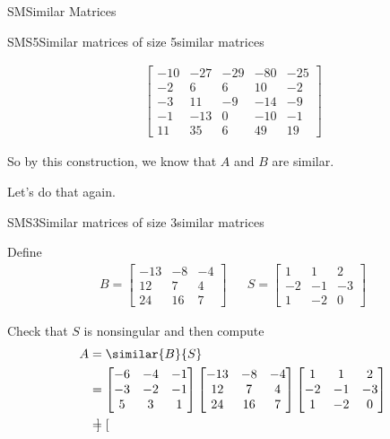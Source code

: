 \begin{subsect}{SM}{Similar Matrices}
\begin{example}{SMS5}{Similar matrices of size 5}{similar matrices}
\begin{para}
\begin{align*}
\begin{bmatrix}
-10 & -27 & -29 & -80 & -25 \\
-2 & 6 & 6 & 10 & -2 \\
-3 & 11 & -9 & -14 & -9 \\
-1 & -13 & 0 & -10 & -1 \\
11 & 35 & 6 & 49 & 19
\end{bmatrix}
%
\end{align*}
\end{para}
%
\begin{para}So by this construction, we know that $A$ and $B$ are similar.\end{para}
%
\end{example}
%
\begin{para}Let's do that again.\end{para}
%
\begin{example}{SMS3}{Similar matrices of size 3}{similar matrices}
\begin{para}Define
\begin{align*}
B=\begin{bmatrix}
-13 & -8 & -4 \\
12 & 7 & 4 \\
24 & 16 & 7
\end{bmatrix}
&&
S=\begin{bmatrix}
1 & 1 & 2 \\
-2 & -1 & -3 \\
1 & -2 & 0
\end{bmatrix}
\end{align*}
\end{para}
%
\begin{para}Check that $S$ is nonsingular and then compute
%
\begin{align*}
A&=\similar{B}{S}\\
&=
\begin{bmatrix}
-6 & -4 & -1 \\
-3 & -2 & -1 \\
5 & 3 & 1
\end{bmatrix}
\begin{bmatrix}
-13 & -8 & -4 \\
12 & 7 & 4 \\
24 & 16 & 7
\end{bmatrix}
\begin{bmatrix}
1 & 1 & 2 \\
-2 & -1 & -3 \\
1 & -2 & 0
\end{bmatrix}\\
&=
\begin{bmatrix}

\end{bmatrix}
\end{align*}
\end{para}
\end{example}
\end{subsect}
